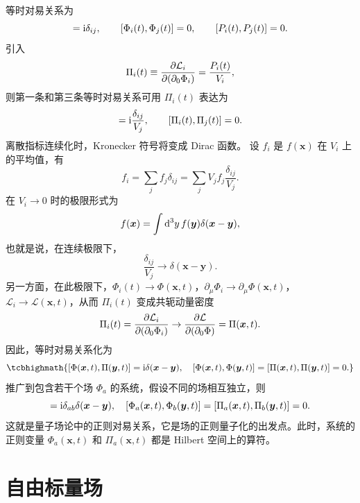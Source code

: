 等时对易关系为
\begin{equation}
  [\Phi_i(t),P_j(t)] = \i\delta_{ij},
  \qquad
  [\Phi_i(t),\Phi_j(t)] = 0,
  \qquad
  [P_i(t),P_j(t)] = 0.
\end{equation}
引入
\begin{equation}
  \Pi_i(t)\equiv \pdv{\mathcal{L}_i}{(\partial_0\Phi_i)}
  = \frac{P_i(t)}{V_i},
\end{equation}
则第一条和第三条等时对易关系可用 $\Pi_i(t)$ 表达为
\begin{equation}
  [\Phi_i(t),\Pi_j(t)] = \i\frac{\delta_{ij}}{V_j},
  \qquad
  [\Pi_i(t),\Pi_j(t)] = 0.
\end{equation}
离散指标连续化时，Kronecker 符号将变成 Dirac 函数。
设 $f_i$ 是 $f(\bm{x})$ 在 $V_i$ 上的平均值，有
\begin{equation}
  f_i = \sum_j f_j\delta_{ij}
      = \sum_j V_j f_j\frac{\delta_{ij}}{V_j}.
\end{equation}
在 $V_i\to0$ 时的极限形式为
\begin{equation}
  f(\bm{x})=\int\dd^3y\,f(\bm{y})\delta(\bm{x}-\bm{y}),
\end{equation}
也就是说，在连续极限下，
\begin{equation}
  \frac{\delta_{ij}}{V_j}\to \delta(\bm{x}-\bm{y}).
\end{equation}
另一方面，在此极限下，$\Phi_i(t)\to\Phi(\bm{x},t)$，$\partial_\mu\Phi_i\to\partial_\mu\Phi(\bm{x},t)$，$\mathcal{L}_i\to\mathcal{L}(\bm{x},t)$，从而 $\Pi_i(t)$ 变成共轭动量密度
\begin{equation}
  \Pi_i(t)=\pdv{\mathcal{L}_i}{(\partial_0\Phi_i)}
  \to \pdv{\mathcal{L}}{(\partial_0\Phi)}
  = \Pi(\bm{x},t).
\end{equation}
因此，等时对易关系化为
\begin{equation}
    \tcbhighmath{
  [\Phi(\bm{x},t),\Pi(\bm{y},t)] = \i\delta(\bm{x}-\bm{y}),
  \quad
  [\Phi(\bm{x},t),\Phi(\bm{y},t)] = 
  [\Pi(\bm{x},t),\Pi(\bm{y},t)] = 0.
    }
\end{equation}
推广到包含若干个场 $\Phi_a$ 的系统，假设不同的场相互独立，则
\begin{equation}
  [\Phi_a(\bm{x},t),\Pi_b(\bm{y},t)] = \i\delta_{ab}\delta(\bm{x}-\bm{y}),
  \quad
  [\Phi_a(\bm{x},t),\Phi_b(\bm{y},t)] = 
  [\Pi_a(\bm{x},t),\Pi_b(\bm{y},t)] = 0.
\end{equation}
这就是量子场论中的正则对易关系，它是场的正则量子化的出发点。此时，系统的正则变量 $\Phi_a(\bm{x},t)$ 和 $\Pi_a(\bm{x},t)$ 都是 Hilbert 空间上的算符。

\section{自由标量场}

